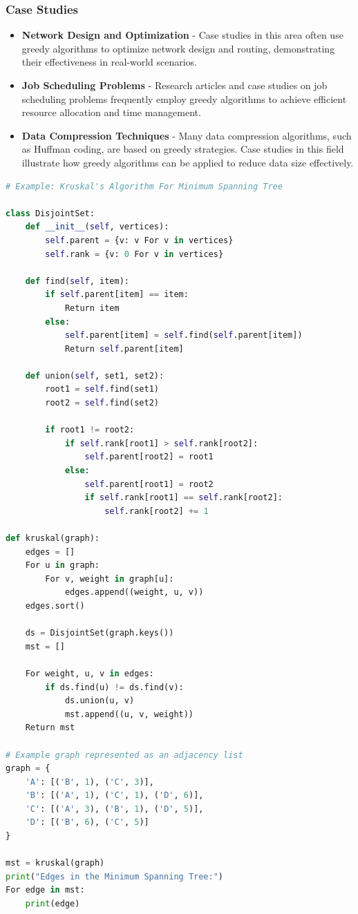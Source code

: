 \documentclass[12pt]{book} %
\begin{document}
\subsubsection*{Case Studies}
\begin{itemize}
    \item \textbf{Network Design and Optimization} - Case studies in this area often use greedy algorithms to optimize network design and routing, demonstrating their effectiveness in real-world scenarios.
    \item \textbf{Job Scheduling Problems} - Research articles and case studies on job scheduling problems frequently employ greedy algorithms to achieve efficient resource allocation and time management.
    \item \textbf{Data Compression Techniques} - Many data compression algorithms, such as Huffman coding, are based on greedy strategies. Case studies in this field illustrate how greedy algorithms can be applied to reduce data size effectively.
\end{itemize}

\FloatBarrier
\begin{lstlisting}[language=Python, caption=Python Implementation of Kruskal's Algorithm]
# Example: Kruskal's Algorithm For Minimum Spanning Tree

class DisjointSet:
    def __init__(self, vertices):
        self.parent = {v: v For v in vertices}
        self.rank = {v: 0 For v in vertices}

    def find(self, item):
        if self.parent[item] == item:
            Return item
        else:
            self.parent[item] = self.find(self.parent[item])
            Return self.parent[item]

    def union(self, set1, set2):
        root1 = self.find(set1)
        root2 = self.find(set2)
        
        if root1 != root2:
            if self.rank[root1] > self.rank[root2]:
                self.parent[root2] = root1
            else:
                self.parent[root1] = root2
                if self.rank[root1] == self.rank[root2]:
                    self.rank[root2] += 1

def kruskal(graph):
    edges = []
    For u in graph:
        For v, weight in graph[u]:
            edges.append((weight, u, v))
    edges.sort()
    
    ds = DisjointSet(graph.keys())
    mst = []
    
    For weight, u, v in edges:
        if ds.find(u) != ds.find(v):
            ds.union(u, v)
            mst.append((u, v, weight))
    Return mst

# Example graph represented as an adjacency list
graph = {
    'A': [('B', 1), ('C', 3)],
    'B': [('A', 1), ('C', 1), ('D', 6)],
    'C': [('A', 3), ('B', 1), ('D', 5)],
    'D': [('B', 6), ('C', 5)]
}

mst = kruskal(graph)
print("Edges in the Minimum Spanning Tree:")
For edge in mst:
    print(edge)
\end{lstlisting}
\FloatBarrier
\end{document}
